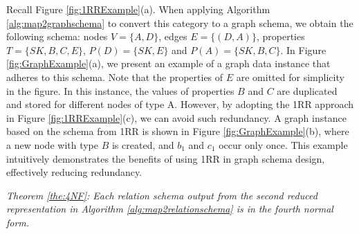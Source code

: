 \begin{example}
Recall Figure \ref{fig:1RRExample}(a). When applying Algorithm \ref{alg:map2graphschema} to convert this category to a graph schema, we obtain the following schema: nodes $V= \{A,D\}$, edges $E= \{(D,A)\}$, properties $T=\{SK,B,C,E\}$, $P(D)=\{SK, E\}$ and $P(A)=\{SK, B, C\}$. In Figure \ref{fig:GraphExample}(a), we present an example of a graph data instance that adheres to this schema. Note that the properties of $E$ are omitted for simplicity in the figure. In this instance, the values of properties $B$ and $C$ are duplicated and stored for different nodes of type A. However, by adopting the 1RR approach in Figure \ref{fig:1RRExample}(c), we can avoid such redundancy. A graph instance based on the schema from 1RR is shown in Figure \ref{fig:GraphExample}(b), where a new node with type $B$ is created, and $b_1$ and $c_1$ occur only once. This example intuitively demonstrates the benefits of using 1RR in graph schema design, effectively reducing redundancy.
\end{example}






\noindent \textit{Theorem \ref{the:4NF}: Each relation schema output from the second reduced representation in Algorithm \ref{alg:map2relationschema} is in the  fourth normal form.}

